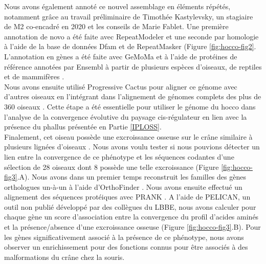 Nous avons également annoté ce nouvel assemblage en éléments répétés, notamment grâce au travail préliminaire de Timothée Kastylevsky, un stagiaire de M2 co-encadré en 2020 et les conseils de Marie Fablet. Une première annotation de novo a été faite avec RepeatModeler \citep{flynn_repeatmodeler2_2020} et une seconde par homologie à l’aide de la base de données Dfam et de RepeatMasker \citep{smit_repeatmasker_2013} (Figure \ref{fig:hocco-fig2}. L’annotation en gènes a été faite avec GeMoMa \citep{kollmar_gemoma_2019} et à l’aide de protéines de référence annotées par Ensembl à partir de plusieurs espèces d’oiseaux, de reptiles et de mammifères \citep{cunningham_ensembl_2019}. \\

Nous avons ensuite utilisé Progressive Cactus \citep{armstrong_progressive_2020} pour aligner ce génome avec d’autres oiseaux en l’intégrant dans l’alignement de génomes complets des plus de 360 oiseaux \citep{feng_dense_2020}. Cette étape a été essentielle pour utiliser le génome du hocco dans l’analyse de la convergence évolutive du paysage cis-régulateur en lien avec la présence du phallus présentée en Partie \ref{IPLOSS}. \\

Finalement, cet oiseau possède une excroissance osseuse sur le crâne similaire à plusieurs lignées d’oiseaux \citep{mayr_survey_2018}. Nous avons voulu tester si nous pouvions détecter un lien entre la convergence de ce phénotype et les séquences codantes d'une sélection de 28 oiseaux dont 8 possède une telle excroissance (Figure \ref{fig:hocco-fig3}.A). Nous avons dans un premier temps reconstruit les familles des gènes orthologues un-à-un à l’aide d’OrthoFinder \citep{emms_orthofinder_2019}. Nous avons ensuite effectué un alignement des séquences protéiques avec PRANK \citep{loytynoja_phylogeny-aware_2014}. A l'aide de PELICAN, un outil non publié développé par des collègues du LBBE, nous avons calculer pour chaque gène un score d'association entre la convergence du profil d’acides aminés et la présence/absence d'une excroissance osseuse (Figure \ref{fig:hocco-fig3}.B). Pour les gènes significativement associé à la présence de ce phénotype, nous avons observer un enrichissement pour des fonctions connus pour être associés à des malformations du crâne chez la souris. \\

